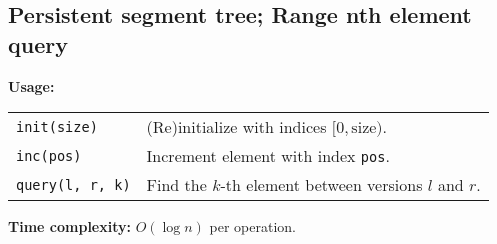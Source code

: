 \subsection{Persistent segment tree; Range nth element query}
\textbf{Usage:} \\[0.1cm]
\begin{tabular}{p{4cm} p{7.5cm}}
  \lstinline|init(size)| & (Re)initialize with indices $[0, \mathrm{size})$. \\
  \lstinline|inc(pos)| & Increment element with index \lstinline|pos|.\\
  \lstinline|query(l, r, k)| & Find the $k$-th element between versions $l$ and $r$. \\
\end{tabular} \par
\textbf{Time complexity:} $O(\log n)$ per operation. \par


